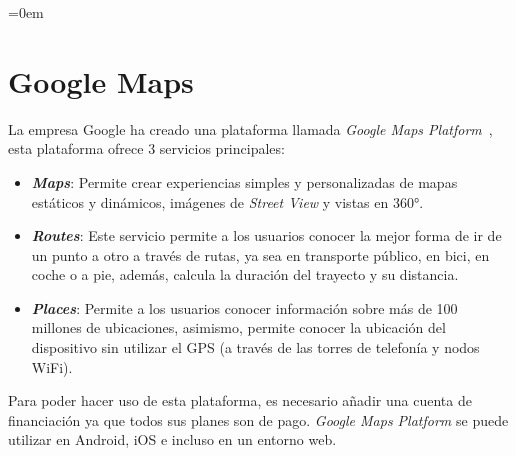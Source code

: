 \parindent=0em
\section{Google Maps}
\noindent

La empresa Google ha creado una plataforma llamada \textit{Google Maps Platform}~\cite{googlemapsPlatform}, esta plataforma ofrece 3 servicios principales:

\begin{itemize}
    \item \textit{\textbf{Maps}}: Permite crear experiencias simples y personalizadas de mapas estáticos y dinámicos, imágenes de \textit{Street View} y vistas en 360°.
    
    \item \textit{\textbf{Routes}}: Este servicio permite a los usuarios conocer la mejor forma de ir de un punto a otro a través de rutas, ya sea en transporte público, en bici, en coche o a pie, además, calcula la duración del trayecto y su distancia.
    
    \item \textit{\textbf{Places}}: Permite a los usuarios conocer información sobre más de 100 millones de ubicaciones, asimismo, permite conocer la ubicación del dispositivo sin utilizar el GPS (a través de las torres de telefonía y nodos WiFi).
    
\end{itemize}

Para poder hacer uso de esta plataforma, es necesario añadir una cuenta de financiación ya que todos sus planes son de pago. \textit{Google Maps Platform} se puede utilizar en Android, iOS e incluso en un entorno web.